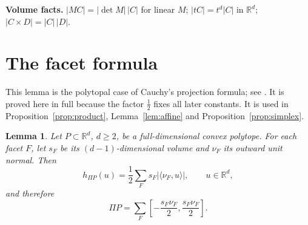 \documentclass[11pt]{article}
\newtheorem{lemma}[theorem]{Lemma}
\newcommand{\R}{\mathbb R}
\begin{document}
\textbf{Volume facts.} \(|MC|=|\det M|\,|C|\) for linear \(M\);
\(|tC|=t^d|C|\) in \(\R^d\); \(|C\times D|=|C|\,|D|\).

\section{The facet formula}\label{sec:facets}

This lemma is the polytopal case of Cauchy's projection formula; see
\cite[Section~1]{Saroglou}. It is proved here in full because the
factor \(\tfrac12\) fixes all later constants. It is used in
Proposition~\ref{prop:product}, Lemma~\ref{lem:affine} and
Proposition~\ref{prop:simplex}.

\begin{lemma}\label{lem:facets}
Let \(P\subset\R^d\), \(d\ge2\), be a full-dimensional convex polytope.
For each facet \(F\), let \(s_F\) be its \((d-1)\)-dimensional volume
and \(\nu_F\) its outward unit normal. Then
\begin{equation}\label{eq:facet}
 h_{\Pi P}(u)=\frac12\sum_Fs_F|\langle\nu_F,u\rangle|,
 \qquad u\in\R^d,
\end{equation}
and therefore
\begin{equation}\label{eq:zonotope}
 \Pi P=\sum_F
 \left[-\frac{s_F\nu_F}{2},\frac{s_F\nu_F}{2}\right].
\end{equation}
\end{lemma}
\end{document}
